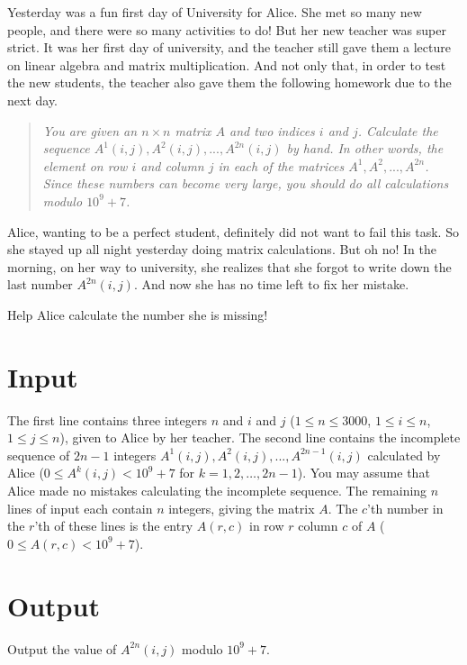 
Yesterday was a fun first day of University for Alice.
She met so many new people, and there were so many activities to do!
But her new teacher was super strict.
It was her first day of university, and the teacher still gave them a lecture on linear algebra and matrix multiplication.
And not only that, in order to test the new students, the teacher also gave them the following homework due to the next day.

\begin{quote}
  \emph{
    You are given an $n \times n$ matrix $A$ and two indices $i$ and $j$.
    Calculate the sequence
    $A^1(i,j), A^2(i,j), ..., A^{2 n}(i,j)$ by hand. In other words, the element on row $i$ and column $j$ in each of the matrices $A^1, A^2, ..., A^{2 n}$.
    Since these numbers can become very large, you should do all calculations modulo $10^9 + 7$.
  }
\end{quote}

Alice, wanting to be a perfect student, definitely did not want to fail this task. So she stayed up all night yesterday doing matrix calculations.
But oh no! In the morning, on her way to university, she realizes that she forgot to write down the last number $A^{2n}(i, j)$. And now she has no time left to fix her mistake.

Help Alice calculate the number she is missing!

\section*{Input}

The first line contains three
integers $n$ and $i$ and $j$ ($1 \le n \le 3000$, $1 \le i \le n$,
$1 \le j \le n$), given to Alice by her teacher.
The second line contains the incomplete sequence of $2 n - 1$ integers $A^1(i,j), A^2(i,j), ..., A^{2 n-1}(i, j)$ calculated by Alice
($0 \leq A^k(i,j) < 10^9 + 7$ for $k = 1, 2, \ldots, 2 n - 1$).
You may assume that Alice made no mistakes calculating the incomplete sequence.
The remaining $n$ lines of input each contain $n$ integers, giving the
matrix $A$.  The $c$'th number in the $r$'th of these lines is the
entry $A(r, c)$ in row $r$ column $c$ of $A$ ($0 \leq A(r,c) < 10^9 +
7$).

\section*{Output}

Output the value of $A^{2 n}(i, j)$ modulo $10^9 + 7$.
